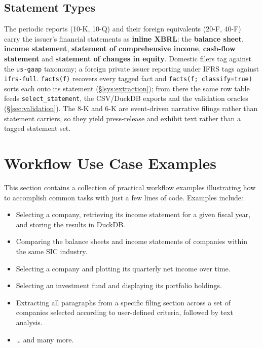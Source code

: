 \documentclass[11pt,a4paper]{report}
\begin{document}
\subsection{Statement Types}\label{sec:edgar-statements}

The periodic reports (10-K, 10-Q) and their foreign equivalents (20-F, 40-F) carry the issuer's financial
statements as \textbf{inline XBRL}: the \textbf{balance sheet}, \textbf{income statement}, \textbf{statement
of comprehensive income}, \textbf{cash-flow statement} and \textbf{statement of changes in equity}. Domestic
filers tag against the \texttt{us-gaap} taxonomy; a foreign private issuer reporting under IFRS tags against
\texttt{ifrs-full}. \texttt{facts(f)} recovers every tagged fact and \texttt{facts(f;\ classify=true)} sorts
each onto its statement (\S\ref{sys:extraction}); from there the same row table feeds
\texttt{select\_statement}, the CSV/DuckDB exports and the validation oracles (\S\ref{sec:validation}). The
8-K and 6-K are event-driven narrative filings rather than statement carriers, so they yield press-release
and exhibit text rather than a tagged statement set.

\section{Workflow Use Case Examples}

This section contains a collection of practical workflow examples illustrating how to accomplish common
tasks with just a few lines of code. Examples include:

\begin{itemize}
  \item Selecting a company, retrieving its income statement for a given fiscal year, and storing the
    results in DuckDB.
  \item Comparing the balance sheets and income statements of companies within the same SIC industry.
  \item Selecting a company and plotting its quarterly net income over time.
  \item Selecting an investment fund and displaying its portfolio holdings.
  \item Extracting all paragraphs from a specific filing section across a set of companies selected
    according to user-defined criteria, followed by text analysis.
  \item \ldots{} and many more.
\end{itemize}
\end{document}

